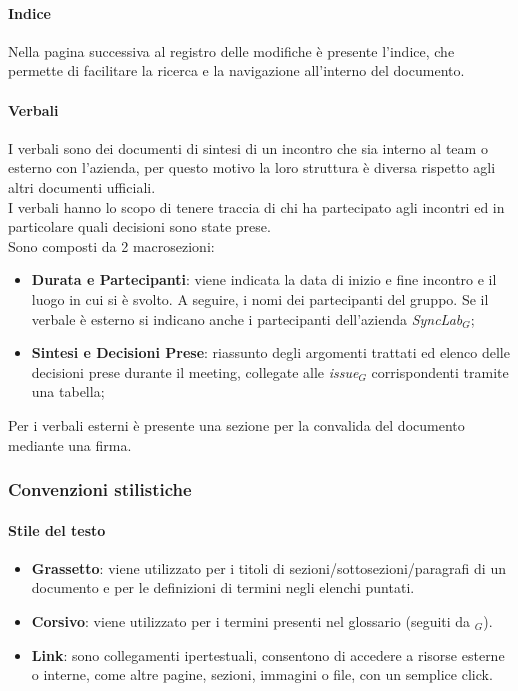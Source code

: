    \paragraph{Indice}
    Nella pagina successiva al registro delle modifiche è presente l’indice, che permette di facilitare la ricerca e la navigazione all’interno del documento.\\

    \paragraph{Verbali}
    I verbali sono dei documenti di sintesi di un incontro che sia interno al team o esterno con l'azienda, per questo motivo la loro struttura è diversa rispetto agli altri documenti ufficiali.\\
    I verbali hanno lo scopo di tenere traccia di chi ha partecipato agli incontri ed in particolare quali decisioni sono state prese.\\
    Sono composti da 2 macrosezioni:
    \begin{itemize}
    \item  \textbf{Durata e Partecipanti}: viene indicata la data di inizio e fine incontro e il luogo in cui si è svolto. A seguire, i nomi dei partecipanti del gruppo. Se il verbale è esterno si indicano anche i partecipanti dell'azienda \textit{SyncLab}$_G$;
    \item  \textbf{Sintesi e Decisioni Prese}: riassunto degli argomenti trattati ed elenco delle decisioni prese durante il meeting, collegate alle \textit{issue}$_G$ corrispondenti tramite una tabella;
    \end{itemize}
    Per i verbali esterni è presente una sezione per la convalida del documento mediante una firma.\\

\subsubsection{Convenzioni stilistiche}
    \paragraph{Stile del testo}
    \begin{itemize}
        \item \textbf{Grassetto}: viene utilizzato per i titoli di sezioni/sottosezioni/paragrafi di un documento e per le definizioni di termini negli elenchi puntati.
        \item \textbf{Corsivo}: viene utilizzato per i termini presenti nel glossario (seguiti da $_G$).
        \item \textbf{Link}: sono collegamenti ipertestuali, consentono di accedere a risorse esterne o interne, come altre pagine, sezioni, immagini o file, con un semplice click.
    \end{itemize}

